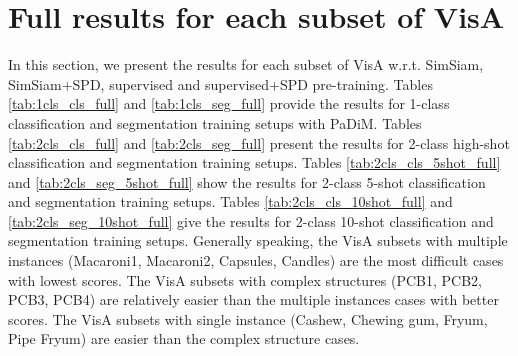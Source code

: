 \documentclass[runningheads]{llncs}
\begin{document}
\section{Full results for each subset of VisA}
In this section, we present the results for each subset of VisA w.r.t. SimSiam, SimSiam+SPD, supervised and supervised+SPD pre-training. Tables \ref{tab:1cls_cls_full} and \ref{tab:1cls_seg_full} provide the results for 1-class classification and segmentation training setups with PaDiM. Tables \ref{tab:2cls_cls_full} and \ref{tab:2cls_seg_full} present the results for 2-class high-shot classification and segmentation training setups. Tables \ref{tab:2cls_cls_5shot_full} and \ref{tab:2cls_seg_5shot_full} show the results for 2-class 5-shot classification and segmentation training setups. Tables \ref{tab:2cls_cls_10shot_full} and \ref{tab:2cls_seg_10shot_full} give the results for 2-class 10-shot classification and segmentation training setups. Generally speaking, the VisA subsets with multiple instances (Macaroni1, Macaroni2, Capsules, Candles) are the most difficult cases with lowest scores. The VisA subsets with complex structures (PCB1, PCB2, PCB3, PCB4) are relatively easier than the multiple instances cases with better scores. The VisA subsets with single instance (Cashew, Chewing gum, Fryum, Pipe Fryum) are easier than the complex structure cases.
\end{document}
